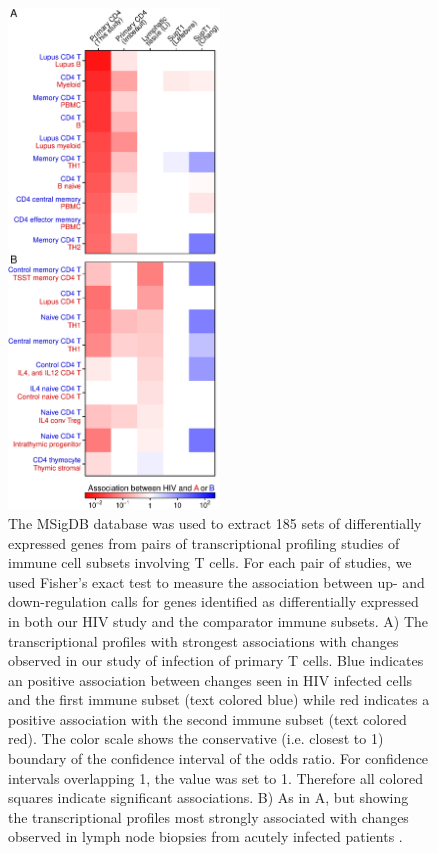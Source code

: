 \documentclass[../sherrill-Mix_thesis.tex]{subfiles}
\begin{document}
		\begin{figure}
			\centering
				\includegraphics[width=0.5\textwidth]{compareMsig.pdf}
			\caption[Comparisons of the effect of HIV infection on cellular gene expression to additional studies comparing transcription in subsets of immune cells.]{The MSigDB database was used to extract 185 sets of differentially expressed genes from pairs of transcriptional profiling studies of immune cell subsets involving \cdFour{} T cells. For each pair of studies, we used Fisher's exact test to measure the association between up- and down-regulation calls for genes identified as differentially expressed in both our HIV study and the comparator immune subsets. A) The transcriptional profiles with strongest associations with changes observed in our study of \hivEight{} infection of primary T cells. Blue indicates an positive association between changes seen in HIV infected cells and the first immune subset (text colored blue) while red indicates a positive association with the second immune subset (text colored red). The color scale shows the conservative (i.e. closest to 1) boundary of the confidence interval of the odds ratio. For confidence intervals overlapping 1, the value was set to 1. Therefore all colored squares indicate significant associations. B) As in A, but showing the transcriptional profiles most strongly associated with changes observed in lymph node biopsies from acutely infected patients \citep{Li2009}. }
			\label{figMsig}
		\end{figure}
\end{document}
